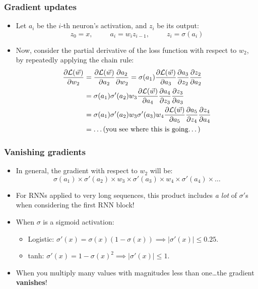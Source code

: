 \documentclass{beamer}
\begin{document}
\begin{frame}
	\frametitle{Gradient updates}
	\begin{itemize}
	\item Let $a_i$ be the $i$-th neuron's activation, and $z_i$ be its output:\[z_0 = x,\ \ \ \ \ \ \ \ \ \ \ a_i = w_iz_{i-1},\ \ \ \ \ \ \ \ \ \ \ z_i = \sigma(a_i)\]
	\vfill
	\item Now, consider the partial derivative of the loss function with respect to $w_2$, by repeatedly applying the chain rule:
		\begin{align*}\frac{\partial\mathcal{L}(\vec{w})}{\partial w_2} &= \frac{\partial\mathcal{L}(\vec{w})}{\partial a_2}\frac{\partial a_2}{\partial w_2} = \sigma(a_1)\frac{\partial\mathcal{L}(\vec{w})}{\partial a_3}\frac{\partial a_3}{\partial z_2}\frac{\partial z_2}{\partial a_2}\\ &= \sigma(a_1)\sigma'(a_2)w_3\frac{\partial\mathcal{L}(\vec{w})}{\partial a_4}\frac{\partial a_4}{\partial z_3}\frac{\partial z_3}{\partial a_3}\\
			&= \sigma(a_1)\sigma'(a_2)w_3\sigma'(a_3)w_4\frac{\partial\mathcal{L}(\vec{w})}{\partial a_5}\frac{\partial a_5}{\partial z_4}\frac{\partial z_4}{\partial a_4}\\ &= \dots (\text{you see where this is going\dots})\\
			\end{align*}
	\end{itemize}
\end{frame}

\begin{frame}
	\frametitle{Vanishing gradients}
	\begin{itemize}
		\item In general, the gradient with respect to $w_2$ will be: 
		\[\sigma(a_1)\times \sigma'(a_2)\times w_3\times \sigma'(a_3)\times w_4\times \sigma'(a_4)\times \dots\]
		\vfill
		\item For RNNs applied to very long sequences, this product includes \emph{a lot} of $\sigma'$s when considering the first RNN block!
		\vfill
		\item When $\sigma$ is a sigmoid activation:
		\begin{itemize}
			\item Logistic: $\sigma'(x) = \sigma(x)(1 - \sigma(x)) \implies |\sigma'(x)| \leq 0.25$.
			\item tanh: $\sigma'(x) = 1 - \sigma(x)^2 \implies |\sigma'(x)| \leq 1$.
		\end{itemize}
		\vfill
		\item When you multiply many values with magnitudes less than one\dots the gradient \textbf{vanishes}!
	\end{itemize}
\end{frame}
\end{document}
